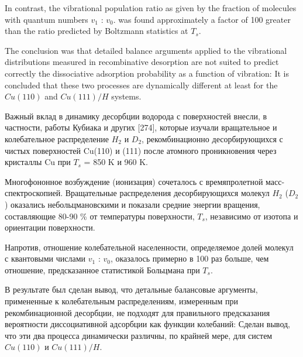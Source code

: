 \documentclass[11pt]{article}
\makeatletter
\newcommand{\boxspacing}{\kern\kvtcb@left@rule\kern\kvtcb@boxsep}
\newcommand{\prompt}[4]{
        {\ttfamily\llap{{\color{#2}[#3]:\hspace{3pt}#4}}\vspace{-\baselineskip}}
    }
\makeatother
\begin{document}
In contrast, the vibrational population ratio as given by the fraction
of molecules with quantum numbers \(v_1\) : \(v_0\). was found
approximately a factor of 100 greater than the ratio predicted by
Boltzmann statistics at \(T_s\).

The conclusion was that detailed balance arguments applied to the
vibrational distributions measured in recombinative desorption are not
suited to predict correctly the dissociative adsorption probability as a
function of vibration: It is concluded that these two processes are
dynamically different at least for the \(Cu(110)\) and \(Cu(111)/H\)
systems.

    Важный вклад в динамику десорбции водорода с поверхностей внесли, в
частности, работы Кубиака и других {[}274{]}, которые изучали
вращательное и колебательное распределение \(H_2\) и \(D_2\),
рекомбинационно десорбирующихся с чистых поверхностей Cu(110) и (111)
после атомного проникновения через кристаллы Cu при \(T_s\) = 850 K и
960 K.

Многофононное возбуждение (ионизация) сочеталось с времяпролетной
масс-спектроскопией. Вращательные распределения десорбирующихся молекул
\(H_2\) (\(D_2\)) оказались небольцмановскими и показали средние энергии
вращения, составляющие 80-90 \% от температуры поверхности, \(T_s\),
независимо от изотопа и ориентации поверхности.

Напротив, отношение колебательной населенности, определяемое долей
молекул с квантовыми числами \(v_1\) : \(v_0\), оказалось примерно в 100
раз больше, чем отношение, предсказанное статистикой Больцмана при
\(T_s\).

В результате был сделан вывод, что детальные балансовые аргументы,
примененные к колебательным распределениям, измеренным при
рекомбинационной десорбции, не подходят для правильного предсказания
вероятности диссоциативной адсорбции как функции колебаний: Сделан
вывод, что эти два процесса динамически различны, по крайней мере, для
систем \(Cu(110)\) и \(Cu(111)/H\).

    \begin{tcolorbox}[breakable, size=fbox, boxrule=1pt, pad at break*=1mm,colback=cellbackground, colframe=cellborder]
\prompt{In}{incolor}{ }{\boxspacing}
\begin{Verbatim}[commandchars=\\\{\}]

\end{Verbatim}
\end{tcolorbox}
\end{document}
